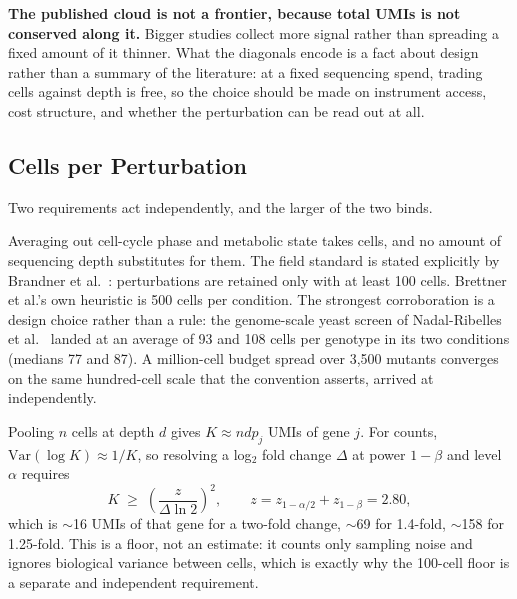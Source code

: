 

\begin{keybox}
\textbf{The published cloud is not a frontier, because total UMIs is not
conserved along it.} Bigger studies collect more signal rather than spreading a
fixed amount of it thinner. What the diagonals encode is a fact about design
rather than a summary of the literature: at a fixed sequencing spend, trading
cells against depth is free, so the choice should be made on instrument access,
cost structure, and whether the perturbation can be read out at all.
\end{keybox}

\subsection{Cells per Perturbation}
\label{sec:cells-per-pert}

Two requirements act independently, and the larger of the two binds.

 Averaging out cell-cycle phase and
metabolic state takes cells, and no amount of sequencing depth substitutes for
them. The field standard is stated explicitly by
Brandner et al.\ \citep{brandnerPooledSinglecellCRISPRa2025}: perturbations are retained only with
at least 100 cells. Brettner et al.'s own heuristic is 500 cells per condition.
The strongest corroboration is a design choice rather than a rule: the
genome-scale yeast screen of Nadal-Ribelles et
al.\ \citep{nadal-ribellesSinglecellResolvedGenotypephenotype2025} landed at an
average of 93 and 108 cells per genotype in its two conditions (medians 77 and
87). A million-cell budget spread over 3{,}500 mutants converges on the same
hundred-cell scale that the convention asserts, arrived at independently.

 Pooling $n$ cells at depth $d$ gives
$K\approx n d p_j$ UMIs of gene $j$. For counts, $\mathrm{Var}(\log K)\approx1/K$,
so resolving a log$_2$ fold change $\Delta$ at power $1-\beta$ and level $\alpha$
requires
\begin{equation}
  K \;\ge\; \left(\frac{z}{\Delta\ln 2}\right)^{2},
  \qquad z = z_{1-\alpha/2}+z_{1-\beta} = 2.80,
  \label{eq:power}
\end{equation}
which is $\sim$16 UMIs of that gene for a two-fold change, $\sim$69 for 1.4-fold,
$\sim$158 for 1.25-fold. This is a floor, not an estimate: it counts only
sampling noise and ignores biological variance between cells, which is exactly
why the 100-cell floor is a separate and independent requirement.

